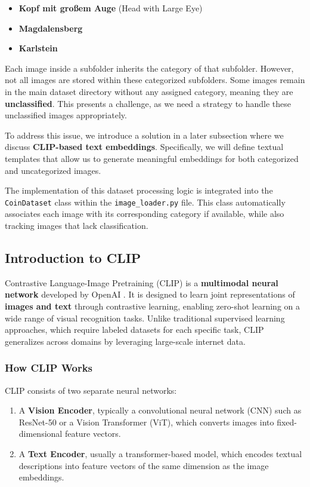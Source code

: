 \documentclass[nolibertine, english, algorithm, nomencl, minted]{ttlab-qualify}
\begin{document}
\begin{itemize}
    \item \textbf{Kopf mit großem Auge} (Head with Large Eye)
    \item \textbf{Magdalensberg} 
    \item \textbf{Karlstein}
\end{itemize}

Each image inside a subfolder inherits the category of that subfolder. 
However, not all images are stored within these categorized subfolders. 
Some images remain in the main dataset directory without any assigned category, 
meaning they are \textbf{unclassified}. This presents a challenge, 
as we need a strategy to handle these unclassified images appropriately.

To address this issue, we introduce a solution in a later subsection where 
we discuss \textbf{CLIP-based text embeddings}\parencite{radford2021learning}. 
Specifically, we will define textual templates that allow us to generate meaningful embeddings for 
both categorized and uncategorized images. 

The implementation of this dataset processing logic is integrated into the \texttt{CoinDataset} 
class within the \texttt{image\_loader.py} file. This class automatically associates each image with its corresponding category 
if available, while also tracking images that lack classification.


\subsection{Introduction to CLIP}

Contrastive Language-Image Pretraining (CLIP) is a \textbf{multimodal neural network}
developed by OpenAI \cite{radford2021learning}. It is designed to learn joint 
representations of \textbf{images and text} through contrastive learning, enabling zero-shot learning on a wide range of 
visual recognition tasks. Unlike traditional supervised learning approaches, which require labeled datasets for each 
specific task, CLIP generalizes across domains by leveraging large-scale internet data.

\subsubsection{How CLIP Works}

CLIP consists of two separate neural networks:
\begin{enumerate}
    \item A \textbf{Vision Encoder}, typically a convolutional neural network (CNN) such as ResNet-50 or 
    a Vision Transformer (ViT), which converts images into fixed-dimensional feature vectors.
    \item A \textbf{Text Encoder}, usually a transformer-based model, which encodes textual descriptions into 
    feature vectors of the same dimension as the image embeddings.
\end{enumerate}
\end{document}

